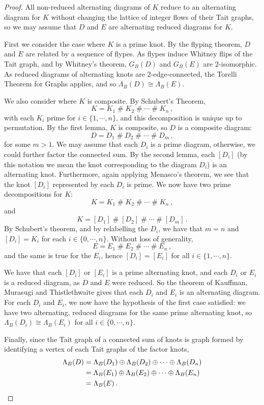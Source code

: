 \documentclass[12pt]{report}
\newcommand{\hash}{\ensuremath{\mathbin{\#}}}
\theoremstyle{upright}
\begin{document}
\begin{proof}
All non-reduced alternating diagrams of $K$ reduce to an alternating diagram for $K$ without changing the lattice of integer flows of their Tait graphs, so we may assume that $D$ and $E$ are alternating reduced diagrams for $K$. 

First we consider the case where $K$ is a prime knot. By the flyping theorem, $D$ and $E$ are related by a sequence of flypes. As flypes induce Whitney flips of the Tait graph, and by Whitney's theorem, $G_{B}(D)$ and $G_{B}(E)$ are $2$-isomorphic. As reduced diagrams of alternating knots are $2$-edge-connected, the Torelli Theorem for Graphs applies, and so $\Lambda_{B}(D) \cong \Lambda_{B}(E)$.

We also consider where $K$ is composite. By Schubert's Theorem,
\[K = K_{1}  \hash K_{2}  \hash \cdots  \hash K_{n}\,,\]
with each $K_{i}$ prime for $i \in \{1, \cdots, n\}$, and this decomposition is unique up to permutation. By the first lemma, $K$ is composite, so $D$ is a composite diagram:
\[D = D_{1}  \hash D_{2}  \hash \cdots  \hash D_{m}\,,\]
for some $m > 1$. We may assume that each $D_{i}$ is a prime diagram, otherwise, we could further factor the connected sum. By the second lemma, each $[D_{i}]$ (by this notation we mean the knot corresponding to the diagram $D_{i}$) is an alternating knot. Furthermore, again applying Menasco's theorem, we see that the knot $[D_{i}]$ represented by each $D_{i}$ is prime. We now have two prime decompositions for $K$:
\[K = K_{1}  \hash K_{2}  \hash \cdots  \hash K_{n}\,,\]
and
\[K = [D_{1}]  \hash [D_{2}]  \hash \cdots  \hash [D_{m}]\,.\]
By Schubert's theorem, and by relabelling the $D_{i}$, we have that $m = n$ and $[D_{i}] = K_{i}$
for each $i \in \{0, \cdots, n\}$. Without loss of generality, \[E = E_{1} \hash E_{2} \hash \cdots \hash E_{n}\,,\] and the same is true for the $E_{i}$, hence
$[D_{i}] = [E_{i}]$
for all $i \in \{1, \cdots, n\}$.

We have that each $[D_{i}]$ or $[E_{i}]$ is a prime alternating knot, and each $D_{i}$ or $E_{i}$ is a reduced diagram, as $D$ and $E$ were reduced. So the theorem of Kauffman, Murasugi and Thistlethwaite gives that each $D_{i}$ and $E_{i}$ is an alternating diagram. For each $D_{i}$ and $E_{i}$, we now have the hypothesis of the first case satisfied: we have two alternating, reduced diagrams for the same prime alternating knot, so $\Lambda_{B}(D_{i}) \cong \Lambda_{B}(E_{i})$ for all $i \in \{0, \cdots, n\}$.

Finally, since the Tait graph of a connected sum of knots is graph formed by identifying a vertex of each Tait graphs of the factor knots,
\begin{align*}
	\Lambda_{B}(D) & = \Lambda_{B}(D_{1}) \oplus \Lambda_{B}(D_{2}) \oplus \cdots \oplus \Lambda_{B}(D_{n}) \\
	               & = \Lambda_{B}(E_{1}) \oplus \Lambda_{B}(E_{2}) \oplus \cdots \oplus \Lambda_{B}(E_{n})\\
	               & = \Lambda_{B}(E)\,. \qedhere \\ 
\end{align*}
\end{proof}
\end{document}
